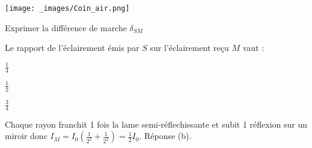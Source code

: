 	\begin{center}
		\texttt{[image: \_images/Coin\_air.png]}
		\end{center}

		

                               \finalisationDuPartageDePage %




\debutEntrainement



\begin{enonce}
Exprimer la différence de marche $\delta_{SM}$
\end{enonce}






\begin{enonce}
	Le rapport de l'éclairement émis par $S$ sur l'éclairement reçu $M$ vaut  : 
	
	\begin{listeQCM3Colonnes}
	\item $\frac{1}{4}$
	\item $\frac{1}{2}$
	\item $\frac{3}{4}$
	\end{listeQCM3Colonnes}

\end{enonce}

\reponse{\reponseB{}}

\begin{corrige}
	Chaque rayon franchit 1 fois la lame semi-réflechissante et subit 1 réflexion sur un miroir donc $I_M=I_0 \left(\frac{1}{2^2} + \frac{1}{2^2}\right)=\frac{1}{2} I_0$. Réponse (b).
\end{corrige}


